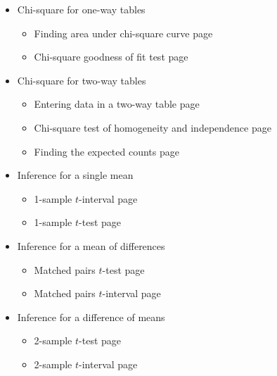 \begin{itemize}
\item[] Chi-square for one-way tables
\begin{itemize}\vspace{-1mm}
\setlength{\itemsep}{0mm}
\item[] Finding area under chi-square curve \hfill page~\pageref{chisqtail}
\item[] Chi-square goodness of fit test \hfill page~\pageref{GOF}
\end{itemize}


\item[]  Chi-square for two-way tables
\begin{itemize}\vspace{-1mm}
\setlength{\itemsep}{0mm}
\item[] Entering data in a two-way table \hfill page~\pageref{2waytable}
\item[] Chi-square test of homogeneity and independence  \hfill page~\pageref{chisq2waytest}
\item[] Finding the expected counts  \hfill page~\pageref{expectedcounts}
\end{itemize}

\item[]  Inference for a single mean
\begin{itemize}\vspace{-1mm}
\setlength{\itemsep}{0mm}
\item[] 1-sample $t$-interval \hfill page~\pageref{1SampTint}
\item[] 1-sample $t$-test  \hfill page~\pageref{1SampTtest}
\end{itemize}



\item[] Inference for a mean of differences
\begin{itemize}\vspace{-1mm}
\setlength{\itemsep}{0mm}
\item[] Matched pairs $t$-test \hfill page~\pageref{matchedpairsttest}
\item[] Matched pairs $t$-interval  \hfill page~\pageref{matchedpairstint}
\end{itemize}


\item[] Inference for a difference of means 
\begin{itemize}\vspace{-1mm}
\setlength{\itemsep}{0mm}
\item[] 2-sample $t$-test  \hfill page~\pageref{2SampTtest}
\item[] 2-sample $t$-interval \hfill page~\pageref{2SampTint}
\end{itemize}



\end{itemize}
